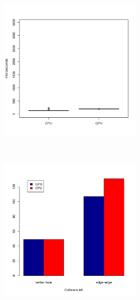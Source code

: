 \begin{figure}
		\begin{subfigure}[b]{0.45\textwidth}
			\begin{subfigure}[b]{0.45\textwidth}
				\includegraphics[width=\textwidth]{results/time/bunny}
			\end{subfigure}
			~%
			\begin{subfigure}[b]{0.45\textwidth}
				\includegraphics[width=\textwidth]{results/correctness/bunny}

\end{subfigure}
\end{subfigure}
\end{figure}
